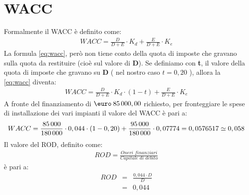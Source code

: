 \section[WACC]{WACC}
	Formalmente il \ac{WACC} è definito come:	
	\begin{equation}
	\label{eq:wacc}
	\begin{split}
		WACC = \frac{D}{D+E} \cdot K_d + \frac{E}{D+E} \cdot K_e 
	\end{split}
	\end{equation}
	La formula \ref{eq:wacc}, però non tiene conto della quota di imposte che gravano sulla quota da restituire (cioè sul valore di \textbf{D}). \newline 
	Se definiamo con \textbf{t}, il valore della quota di imposte che gravano su \textbf{D} ( nel nostro caso $ t = 0,20 $ ), allora la \ref{eq:wacc} diventa:
	\begin{equation}
	\label{eq:wacc_tax}
	\begin{split}
		WACC = \frac{D}{D+E} \cdot K_d \cdot ( 1 - t ) + \frac{E}{D+E} \cdot K_e 
	\end{split}
	\end{equation}	
	A fronte del finanziamento di $\mbox{\euro} \: 85\thinspace 000,00$ richiesto, per fronteggiare le spese di installazione dei vari impianti il valore del \ac{WACC} è pari a:
	\begin{equation}
	\label{eq:wacc_tax_value}
	\begin{split}
		WACC = \frac{85\thinspace 000}{180\thinspace 000} \cdot 0,044 \cdot ( 1 - 0,20 ) + \frac{95\thinspace 000}{180\thinspace 000} \cdot 0,07774 = 0,0576517 \simeq 0,058
	\end{split}
	\end{equation}
	Il valore del \ac{ROD}, definito come:
	\begin{equation}
	\label{eq:rod_definizione}
	\begin{split}
		ROD = \frac{\textit{Oneri finanziari}}{\textit{Capitale di debito}} 
	\end{split}
	\end{equation}
	è pari a:
	\begin{eqnarray}
	\label{eq:rod_calcolo}	
		ROD & = & \frac{0,044 \cdot D}{D} \nonumber \\
			& = & 0,044	
	\end{eqnarray}